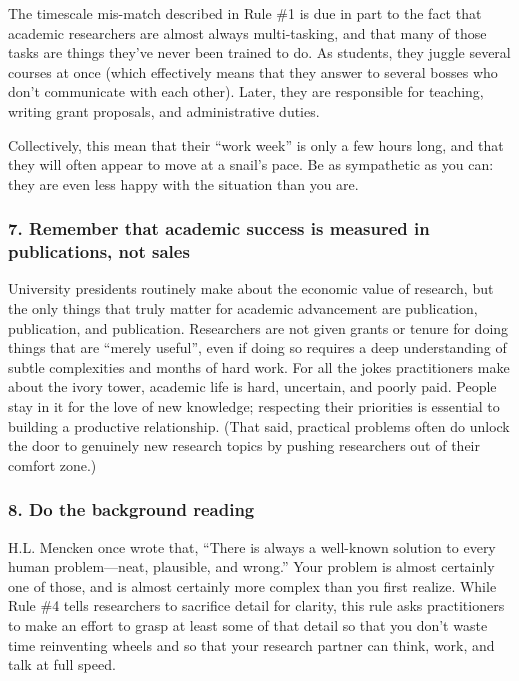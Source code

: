 \documentclass[10pt,letterpaper]{article}
\begin{document}
The timescale mis-match described in Rule \#1 is due in part to the fact that
academic researchers are almost always multi-tasking, and that many of those
tasks are things they've never been trained to do. As students, they juggle
several courses at once (which effectively means that they answer to several
bosses who don't communicate with each other). Later, they are responsible for
teaching, writing grant proposals, and administrative duties.

Collectively, this mean that their ``work week'' is only a few hours long, and
that they will often appear to move at a snail's pace. Be as sympathetic as you
can: they are even less happy with the situation than you are.

\subsubsection*{7. Remember that academic success is measured in publications, not sales}

University presidents routinely make about the economic value of research, but
the only things that truly matter for academic advancement are publication,
publication, and publication. Researchers are not given grants or tenure for
doing things that are ``merely useful'', even if doing so requires a deep
understanding of subtle complexities and months of hard work. For all the jokes
practitioners make about the ivory tower, academic life is hard, uncertain, and
poorly paid. People stay in it for the love of new knowledge; respecting their
priorities is essential to building a productive relationship. (That said,
practical problems often do unlock the door to genuinely new research topics by
pushing researchers out of their comfort zone.)

\subsubsection*{8. Do the background reading}

H.L. Mencken once wrote that, ``There is always a well-known solution to every
human problem—neat, plausible, and wrong.'' Your problem is almost certainly
one of those, and is almost certainly more complex than you first realize. While
Rule \#4 tells researchers to sacrifice detail for clarity, this rule asks
practitioners to make an effort to grasp at least some of that detail so that
you don't waste time reinventing wheels and so that your research partner can
think, work, and talk at full speed.
\end{document}
